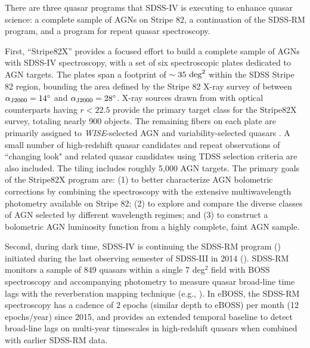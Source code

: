 There are three quasar programs that SDSS-IV is executing to
enhance quasar science: a complete sample of AGNs on Stripe 82, a
continuation of the SDSS-RM program, and a program for repeat quasar
spectroscopy.

First, ``Stripe82X'' provides a focused effort to build
a complete sample of AGNs with SDSS-IV spectroscopy, with a set of six
spectroscopic plates dedicated to AGN targets.  The plates span a
footprint of $\sim35~{\rm deg}^2$ within the SDSS Stripe 82 region,
bounding the area defined by the Stripe 82 X-ray survey of
\citet{lamassa2016} between $\alpha_{\rm J2000}=14^\circ$ and 
$\alpha_{\rm J2000}=28^\circ$. X-ray sources drawn
from \citet{lamassa2016} with optical counterparts having
$r<22.5$ provide the primary target class for the Stripe82X survey,
totaling nearly 900 objects. The remaining fibers on each plate are
primarily assigned to {\it WISE}-selected AGN \citep[using the R75 color
criteria of][]{assef13a} and variability-selected quasars
\citep{peters15a, palanquedelabrouille16a}. A small number of high-redshift 
quasar candidates and repeat observations of ``changing look" and
related quasar candidates using TDSS selection criteria are also
included. The tiling includes roughly 5,000 AGN targets. The primary
goals of the Stripe82X program are: (1) to better characterize AGN
bolometric corrections by combining the spectroscopy with the
extensive multiwavelength photometry available on Stripe 82; (2) to
explore and compare the diverse classes of AGN selected by different
wavelength regimes; and (3) to construct a bolometric AGN luminosity
function from a highly complete, faint AGN sample.

Second, during dark time, SDSS-IV is continuing the SDSS-RM program
(\citealt{shen15a}) initiated during the last observing semester of
SDSS-III in 2014 (\citealt{alam15b}). SDSS-RM monitors a sample of 849
quasars within a single 7 deg$^2$ field with BOSS spectroscopy and
accompanying photometry to measure quasar broad-line time lags with
the reverberation mapping technique (e.g., \citealt{blandford82a,
peterson93a}).  In eBOSS, the SDSS-RM spectroscopy has a cadence of 2
epochs (similar depth to eBOSS) per month (12 epochs/year) since 2015,
and provides an extended temporal baseline to detect broad-line lags
on multi-year timescales in high-redshift quasars when combined with
earlier SDSS-RM data.

